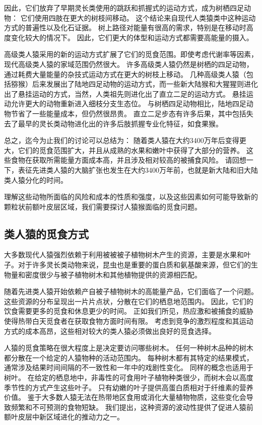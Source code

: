 因此，它们放弃了早期灵长类使用的跳跃和抓握式的运动方式，成为树栖四足动物：
它们使用四肢在更大的树枝间移动。
这个结论来自现代人类猿类中这种运动方式的普遍性\cite{schmitt2010primate}以及化石证据\cite{fleagle2013primate}。
树上路径对能量有很高的需求\cite{janson1988food}，特别是在移动时高度变化较大的情况下。
因此，它们更大的体型和运动方式都需要高能量的摄入。


高级类人猿采用的新的运动方式扩展了它们的觅食范围。即使考虑代谢率等因素，现代高级类人猿的家域范围仍然很大\cite{martin1981relative}。
许多高级类人猿仍然是树栖的四足动物，通过耗费大量能量的杂技式运动方式在更大的树枝上移动。
几种高级类人猿（包括猕猴）后来发展出了陆地四足动物的运动方式，而一些新大陆猴和大猩猩则进化出了悬挂运动的方式，当然，人类祖先则进化出了直立二足的运动方式。
悬挂运动允许更大的动物重新进入细枝分支生态位。
与树栖四足动物相比，陆地四足动物节省了一些能量成本\cite{janson1988food}，但仍然很昂贵。
直立二足步态有许多后果，其中包括失去了最早的灵长类动物进化出的许多后肢抓握专业化特征，如食果猴。


总之，迄今为止我们的讨论可以总结为：
随着类人猿在大约3400万年后变得更大，它们的觅食范围扩大，并且从成熟的水果和嫩叶中获得了大部分的营养。
这些食物在获取所需能量方面成本高，并且涉及相对较高的被捕食风险。
请回想一下，表征先进类人猿的大脑扩张也发生在大约3400万年前，也就是新大陆和旧大陆类人猿分化的时间。


理解这些动物所面临的风险和成本的性质和强度，以及这些因素如何可能导致新的颗粒状前额叶皮层区域，我们需要探讨人猿猴面临的觅食问题。



\subsection{类人猿的觅食方式}

大多数现代人猿强烈依赖于利用被被被子植物树木产生的资源，主要是水果和叶子。对于许多灵长类动物来说，昆虫也是重要的蛋白质和氨基酸来源，但它们的生物量和密度很少与被子植物树木和其他植物提供的资源相匹配。


随着先进类人猿开始依赖产自被子植物树木的高能量产品，它们面临了一个问题。
这些资源的分布呈现出一片片点状，分散在它们的栖息地范围内。
因此，它们的饮食需要更多的觅食和休息更少的时间。
正如我们所见，热应激和被捕食的威胁使得热带白天觅食者在获取食物方面时间有限。
考虑到竞争的激烈程度和其运动方式的成本高昂，这些相对较大的类人猿必须做出良好的觅食选择。


人猿的觅食策略在很大程度上是决定要访问哪些树木。
任何一种树木品种的树木都分散在一个给定的人猿物种的活动范围内。
每种树木都有其特定的结果模式，通常涉及结果时间间隔的不一致性和一年中的戏剧性变化\cite{chapman1999fruit,janmaat2006primates}。
同样的概念也适用于树叶。
在给定的栖息地中，非毒性的可食用叶子植物种类很少，而树木会以高度季节性的方式产生这些叶子\cite{dominy2004fruits}。
只有幼嫩的叶子提供高蛋白质相对于纤维素的营养价值。
鉴于大多数人猿无法在热带地区食用或消化大量植物物质，这些变化会导致频繁和不可预测的食物短缺。
我们提出，这种资源的波动性提供了促进人猿前额叶皮层中新区域进化的推动力之一。


